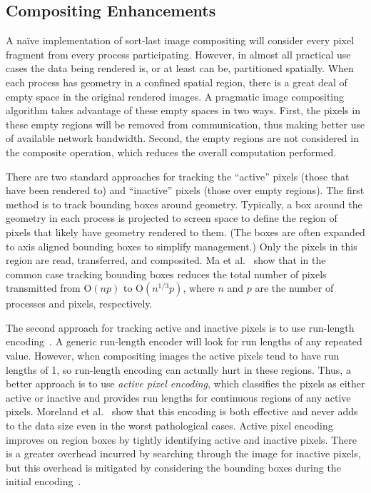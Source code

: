 \documentclass{acm_proc_article-sp}
\newcommand*{\lcite}[1]{~\cite{#1}}
\newcommand*{\scite}[1]{~\cite{#1}}
\newcommand{\etal}{et al.}
\newcommand*{\keyterm}[1]{\emph{#1}}
\newcommand{\Oh}{\mathrm{O}}
\begin{document}
\subsection{Compositing Enhancements}
\label{sec:CompositingEnhancements}

A na\"{i}ve implementation of sort-last image compositing will consider
every pixel fragment from every process participating.  However, in almost
all practical use cases the data being rendered is, or at least can be,
partitioned spatially.  When each process has geometry in a confined
spatial region, there is a great deal of empty space in the original
rendered images.  A pragmatic image compositing algorithm takes advantage
of these empty spaces in two ways.  First, the pixels in these empty
regions will be removed from communication, thus making better use of
available network bandwidth.  Second, the empty regions are not considered
in the composite operation, which reduces the overall computation
performed.

There are two standard approaches for tracking the ``active'' pixels (those
that have been rendered to) and ``inactive'' pixels (those over empty
regions).  The first method is to track bounding boxes around geometry.
Typically, a box around the geometry in each process is projected to screen
space to define the region of pixels that likely have geometry rendered to
them.  (The boxes are often expanded to axis aligned bounding boxes to
simplify management.)  Only the pixels in this region are read,
transferred, and composited.  Ma \etal\scite{BinarySwap2} show that in the
common case tracking bounding boxes reduces the total number of pixels
transmitted from $\Oh(n p)$ to $\Oh(n^{1/3} p)$, where $n$ and $p$ are the
number of processes and pixels, respectively.

The second approach for tracking active and inactive pixels is to use
run-length encoding\lcite{Ahrens1998}.  A generic run-length encoder
will look for run lengths of any repeated value.  However, when compositing
images the active pixels tend to have run lengths of 1, so run-length
encoding can actually hurt in these regions.  Thus, a better approach is to
use \keyterm{active pixel encoding}, which classifies the pixels as either
active or inactive and provides run lengths for continuous regions of any
active pixels.  Moreland \etal\scite{Moreland2001} show that this
encoding is both effective and never adds to the data size even in the
worst pathological cases.  Active pixel encoding improves on region boxes
by tightly identifying active and inactive pixels.  There is a greater
overhead incurred by searching through the image for inactive pixels, but
this overhead is mitigated by considering the bounding boxes during the
initial encoding\lcite{Yang1999}.
\end{document}
